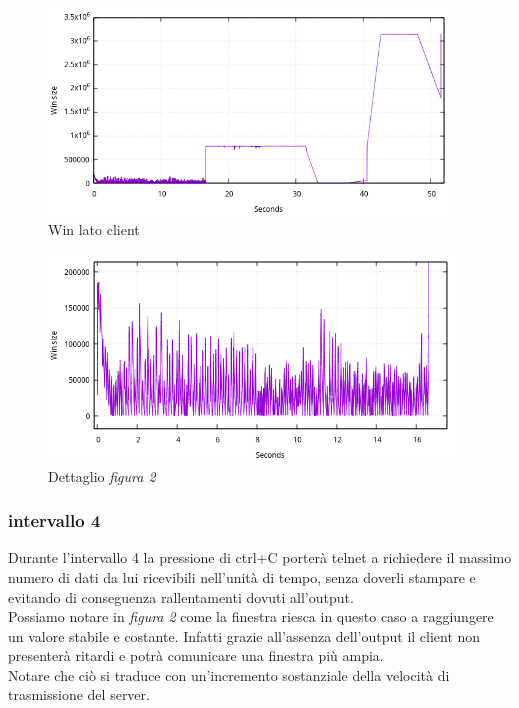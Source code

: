 \documentclass[12pt]{article}
\begin{document}
\begin{figure}[h]
  \centering	
  \includegraphics[height=5.5cm]{client_win_lines.png}
  \caption{Win lato client }
  \label{client_ack}
\end{figure}

\begin{figure}[H]
  \centering
  \includegraphics[height=5.5cm]{client_win_lines_zoom.png}
  \caption{Dettaglio \textit{figura 2} }
  \label{client_ack_zoom}
\end{figure}

\subsubsection{intervallo 4}
Durante l'intervallo 4 la pressione di ctrl+C porterà telnet a richiedere il massimo numero di dati da lui ricevibili nell'unità di tempo, senza doverli stampare e evitando di conseguenza rallentamenti dovuti all'output.\\ 
Possiamo notare in \textit{figura 2} come la finestra riesca in questo caso a raggiungere un valore stabile e costante.
Infatti grazie all'assenza dell'output il client non presenterà ritardi e potrà comunicare una finestra più ampia.\\
Notare che ciò si traduce con un'incremento sostanziale della velocità di trasmissione del server.
\end{document}
